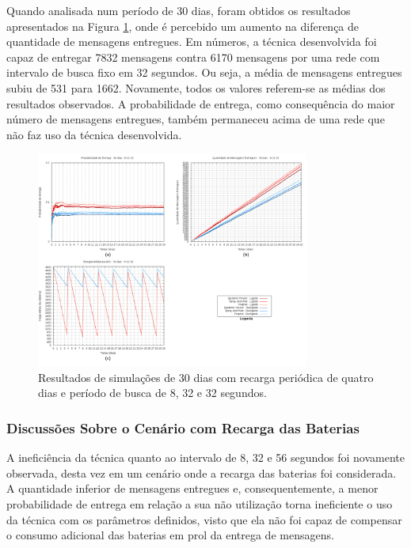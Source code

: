 Quando analisada num período de 30 dias, foram obtidos os resultados apresentados na Figura \ref{30dias_8-32-32_comRecarga_345600}, onde é percebido um aumento na diferença de quantidade de mensagens entregues. Em números, a técnica desenvolvida foi capaz de entregar 7832 mensagens contra 6170 mensagens por uma rede com intervalo de busca fixo em 32 segundos. Ou seja, a média de mensagens entregues subiu de 531 para 1662. Novamente, todos os valores referem-se as médias dos resultados observados. A probabilidade de entrega, como consequência do maior número de mensagens entregues, também permaneceu acima de uma rede que não faz uso da técnica desenvolvida.

\begin{figure}
\centering
\includegraphics[width=0.8\textwidth]{figuras/cap_5/graficos/8_32_32/MessageDeliveryReport_30_8-32-32_withRecharge_345600.png}
\caption{Resultados de simulações de 30 dias com recarga periódica de quatro dias e período de busca de 8, 32 e 32 segundos.}
\label{30dias_8-32-32_comRecarga_345600}
\end{figure}

\subsubsection{Discussões Sobre o Cenário com Recarga das Baterias}

A ineficiência da técnica quanto ao intervalo de 8, 32 e 56 segundos foi novamente observada, desta vez em um cenário onde a recarga das baterias foi considerada. A quantidade inferior de mensagens entregues e, consequentemente, a menor probabilidade de entrega em relação a sua não utilização torna ineficiente o uso da técnica com os parâmetros definidos, visto que ela não foi capaz de compensar o consumo adicional das baterias em prol da entrega de mensagens.

